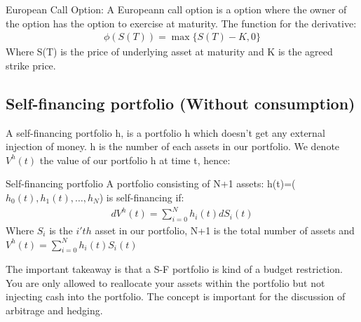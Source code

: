 \theoremstyle{definition}
\begin{definition}{European Call Option:}\label{ECall}
A Europeann call option is a option where the owner of the option has the option to exercise at maturity. The function for the derivative:
\begin{equation}
\begin{split}
\phi(S(T))=\max\{S(T)-K, 0\}
\end{split}
\end{equation}
Where S(T) is the price of underlying asset at maturity and K is the agreed strike price.
\end{definition}
\parencite{finKont}



\subsection{Self-financing portfolio (Without consumption)}
A self-financing portfolio h, is a portfolio h which doesn't get any external injection of money. h is the number of each assets in our portfolio. We denote $V^{h}(t)$ the value of our portfolio h at time t, hence:
\theoremstyle{definition}
\begin{definition}{Self-financing portfolio}
A portfolio consisting of N+1 assets: h(t)=($h_0(t),h_1(t), \dotsc, h_{N}$) is self-financing if:
\begin{equation}\label{SF}
\begin{split}
dV^{h}(t)=\sum_{i=0}^{N} h_{i}(t) dS_{i}(t)
\end{split}
\end{equation}
Where $S_{i}$ is the $i'th$ asset in our portfolio, N+1 is the total number of assets and\\
$V^{h}(t)=\sum_{i=0}^{N} h_{i}(t) S_{i}(t)$
\end{definition}
The important takeaway is that a S-F portfolio is kind of a budget restriction. You are only allowed to reallocate your assets within the portfolio but not injecting cash into the portfolio. The concept is important for the discussion of arbitrage and hedging.

